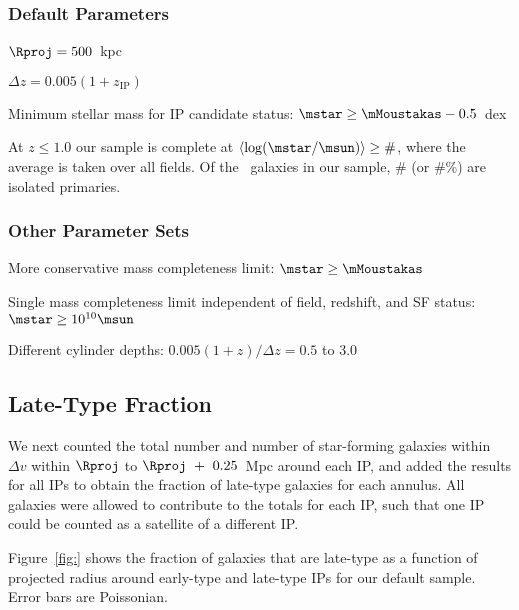 \subsubsection{Default Parameters}\label{sec:defaultParams}

$\Rproj=500$~kpc

$\Delta z=0.005(1+z_{\text{IP}})$ 

Minimum stellar mass for IP candidate status: $\mstar \ge \mMoustakas-0.5$~dex

At $z\le1.0$ our sample is complete at $\langle \log(\mstar/\msun) \rangle \ge \#$, where the average is taken over all fields.  Of the \totalgals~galaxies in our sample, $\#$ (or $\#\%$) are isolated primaries.

\subsubsection{Other Parameter Sets}

More conservative mass completeness limit: $\mstar \ge \mMoustakas$

Single mass completeness limit independent of field, redshift, and SF status: $\mstar \ge 10^{10} \msun$

Different cylinder depths: $0.005(1+z)/\Delta z=0.5$ to 3.0

%

\subsection{Late-Type Fraction}

We next counted the total number and number of star-forming galaxies within $\Delta v$ within $\Rproj$ to $\Rproj~+~0.25$~Mpc around each IP, and added the results for all IPs to obtain the fraction of late-type galaxies for each annulus.  All galaxies were allowed to contribute to the totals for each IP, such that one IP could be counted as a satellite of a different IP.

Figure~\ref{fig:} shows the fraction of galaxies that are late-type as a function of projected radius around early-type and late-type IPs for our default sample.  Error bars are Poissonian.

